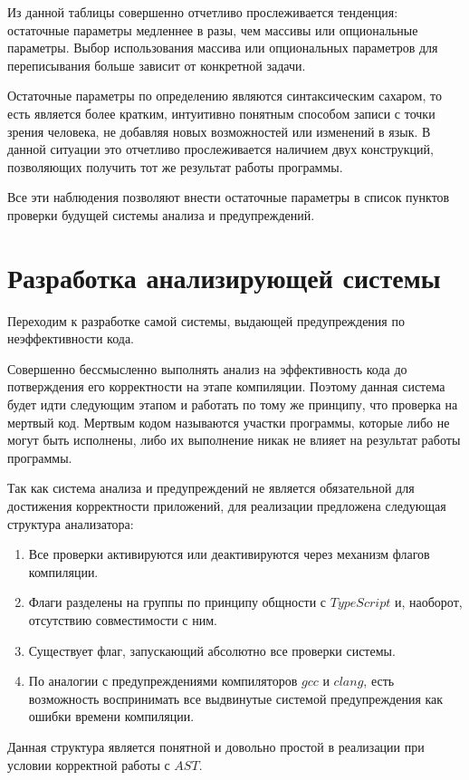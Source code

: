 \documentclass{mipt-thesis-bs}
\begin{document}
Из данной таблицы совершенно отчетливо прослеживается тенденция:
остаточные параметры медленнее в разы, чем массивы или опциональные параметры.
Выбор использования массива или опциональных параметров для переписывания больше
зависит от конкретной задачи.

Остаточные параметры по определению являются синтаксическим сахаром, то есть является
более кратким, интуитивно понятным способом записи с точки зрения человека, не добавляя
новых возможностей или изменений в язык. В данной ситуации это отчетливо прослеживается
наличием двух конструкций, позволяющих получить тот же результат работы программы.

Все эти наблюдения позволяют внести остаточные параметры в список пунктов проверки
будущей системы анализа и предупреждений.

\section{Разработка анализирующей системы}

Переходим к разработке самой системы, выдающей предупреждения по неэффективности кода.

Совершенно бессмысленно выполнять 
анализ на эффективность кода до потверждения его корректности на этапе компиляции. 
Поэтому данная система будет идти следующим этапом и работать по тому же принципу, что 
проверка на мертвый код. Мертвым кодом называются участки программы, 
которые либо не могут быть исполнены, либо их выполнение никак не влияет на 
результат работы программы.

Так как система анализа и предупреждений не является обязательной для 
достижения корректности приложений, для реализации предложена 
следующая структура анализатора:
\begin{enumerate}
    \item Все проверки активируются или 
    деактивируются через механизм флагов компиляции.
    \item Флаги разделены на группы по 
    принципу общности с $TypeScript$ и, наоборот, отсутствию совместимости с ним.
    \item Существует флаг, запускающий абсолютно все проверки системы.
    \item По аналогии с предупреждениями компиляторов $gcc$ и $clang$,
    есть возможность воспринимать все выдвинутые системой предупреждения 
    как ошибки времени компиляции.
\end{enumerate}

Данная структура является понятной и довольно простой в реализации при условии 
корректной работы с $AST$.
\end{document}
